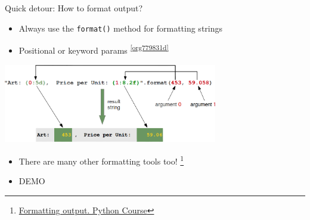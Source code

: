 \documentclass[presentation]{beamer}
\begin{document}
\begin{frame}[label={sec:org5f1803c},fragile]{Quick detour: How to format output?}
 \begin{itemize}
\item Always use the \texttt{format()} method for formatting strings
\item Positional or keyword params \textsuperscript{\ref{org779831d}}
\end{itemize}
\begin{center}
\includegraphics[width=0.7\textwidth]{images/format_method_positional_parameters.png}
\end{center}
\begin{itemize}
\item There are many other formatting tools too! \footnote{\href{https://www.python-course.eu/python3\_formatted\_output.php}{Formatting output. Python Course}}
\item \alert{DEMO}
\end{itemize}
\end{frame}
\end{document}
